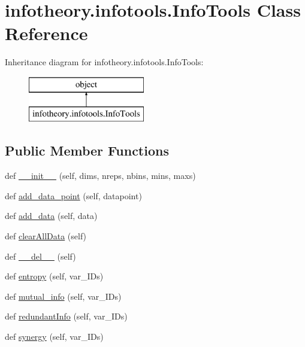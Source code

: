 \hypertarget{classinfotheory_1_1infotools_1_1_info_tools}{}\section{infotheory.\+infotools.\+Info\+Tools Class Reference}
\label{classinfotheory_1_1infotools_1_1_info_tools}
Inheritance diagram for infotheory.\+infotools.\+Info\+Tools\+:\begin{figure}[H]
\begin{center}
\leavevmode
\includegraphics[height=2.000000cm]{classinfotheory_1_1infotools_1_1_info_tools}
\end{center}
\end{figure}
\subsection*{Public Member Functions}
\begin{DoxyCompactItemize}
\item 
def \mbox{\hyperlink{classinfotheory_1_1infotools_1_1_info_tools_aee293b361cf0511b521fbdc88a3e4d15}{\+\_\+\+\_\+init\+\_\+\+\_\+}} (self, dims, nreps, nbins, mins, maxs)
\item 
def \mbox{\hyperlink{classinfotheory_1_1infotools_1_1_info_tools_a56f38bf629e7a7831f3d0ee738df1077}{add\+\_\+data\+\_\+point}} (self, datapoint)
\item 
def \mbox{\hyperlink{classinfotheory_1_1infotools_1_1_info_tools_a7a424c5612b0bd7f9e06358283bab828}{add\+\_\+data}} (self, data)
\item 
def \mbox{\hyperlink{classinfotheory_1_1infotools_1_1_info_tools_ab869cf9c1cfa0462dba819a52d040304}{clear\+All\+Data}} (self)
\item 
def \mbox{\hyperlink{classinfotheory_1_1infotools_1_1_info_tools_a702d0595303876470eec677c2d3807c8}{\+\_\+\+\_\+del\+\_\+\+\_\+}} (self)
\item 
def \mbox{\hyperlink{classinfotheory_1_1infotools_1_1_info_tools_afe2bba77e05df1103d38261748772a18}{entropy}} (self, var\+\_\+\+I\+Ds)
\item 
def \mbox{\hyperlink{classinfotheory_1_1infotools_1_1_info_tools_a77f444a7cba9457f8bf30c9e2d02ea86}{mutual\+\_\+info}} (self, var\+\_\+\+I\+Ds)
\item 
def \mbox{\hyperlink{classinfotheory_1_1infotools_1_1_info_tools_a865054984e7894a8e4852f6ac26fad98}{redundant\+Info}} (self, var\+\_\+\+I\+Ds)
\item 
def \mbox{\hyperlink{classinfotheory_1_1infotools_1_1_info_tools_a752b75f1a367372d02edc0d1bf1b78ec}{synergy}} (self, var\+\_\+\+I\+Ds)
\end{DoxyCompactItemize}
